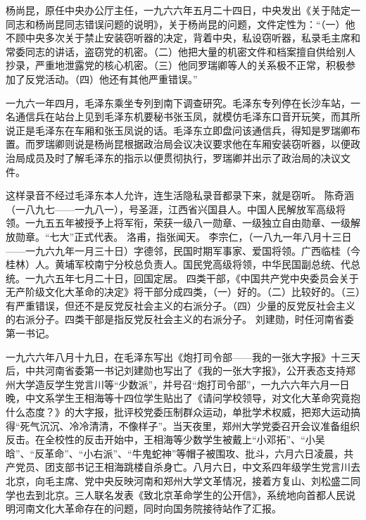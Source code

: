 \begin{maonote}
杨尚昆，原任中央办公厅主任，一九六六年五月二十四日，中央发出《关于陆定一同志和杨尚昆同志错误问题的说明》，关于杨尚昆的问题，文件定性为：“（一）他不顾中央多次关于禁止安装窃听器的决定，背着中央，私设窃听器，私录毛主席和常委同志的讲话，盗窃党的机密。（二）他把大量的机密文件和档案擅自供给别人抄录，严重地泄露党的核心机密。（三）他同罗瑞卿等人的关系极不正常，积极参加了反党活动。（四）他还有其他严重错误。”

一九六一年四月，毛泽东乘坐专列到南下调查研究。毛泽东专列停在长沙车站，一名通信兵在站台上见到毛泽东机要秘书张玉凤，就模仿毛泽东口音开玩笑，而其所说正是毛泽东在车厢和张玉凤说的话。毛泽东立即盘问该通信兵，得知是罗瑞卿布置。而罗瑞卿则说是杨尚昆根据政治局会议决议要求他在车厢安装窃听器，以便政治局成员及时了解毛泽东的指示以便贯彻执行，罗瑞卿并出示了政治局的决议文件。

这样录音不经过毛泽东本人允许，连生活隐私录音都录下来，就是窃听。
陈奇涵（一八九七——一九八一），号圣涯，江西省兴国县人。中国人民解放军高级将领。一九五五年被授予上将军衔，荣获一级八一勋章、一级独立自由勋章、一级解放勋章。“七大”正式代表。
洛甫，指张闻天。
李宗仁，（一八九一年八月十三日——一九六九年一月三十日）字德邻，民国时期军事家、爱国将领。广西临桂（今桂林）人。黄埔军校南宁分校总负责人。国民党高级将领，中华民国副总统、代总统。一九六五年七月二十日，回国定居。
四类干部，《中国共产党中央委员会关于无产阶级文化大革命的决定》将干部分成四类，（一）好的。（二）比较好的。（三）有严重错误，但还不是反党反社会主义的右派分子。（四）少量的反党反社会主义的右派分子。四类干部是指反党反社会主义的右派分子。
刘建勋，时任河南省委第一书记。

一九六六年八月十九日，在毛泽东写出《炮打司令部——我的一张大字报》十三天后，中共河南省委第一书记刘建勋也写出了《我的一张大字报》，公开表态支持郑州大学造反学生党言川等“少数派”，并号召“炮打司令部”，一九六六年六月一日晚，中文系学生王相海等十四位学生贴出了《请问学校领导，对文化大革命究竟抱什么态度？》的大字报，批评校党委压制群众运动，单批学术权威，把郑大运动搞得“死气沉沉、冷冷清清，不像样子”。当天夜里，郑州大学党委召开会议准备组织反击。在全校性的反击开始中，王相海等少数学生被戴上“小邓拓”、“小吴晗”、“反革命”、“小右派”、“牛鬼蛇神”等帽子被围攻、批斗，六月六日凌晨，共产党员、团支部书记王相海跳楼自杀身亡。八月六日，中文系四年级学生党言川去北京，向毛主席、党中央反映河南和郑州大学文革情况，接着方复山、刘松盛二同学也去到北京。三人联名发表《致北京革命学生的公开信》，系统地向首都人民说明河南文化大革命存在的问题，同时向国务院接待站作了汇报。


\end{maonote}
